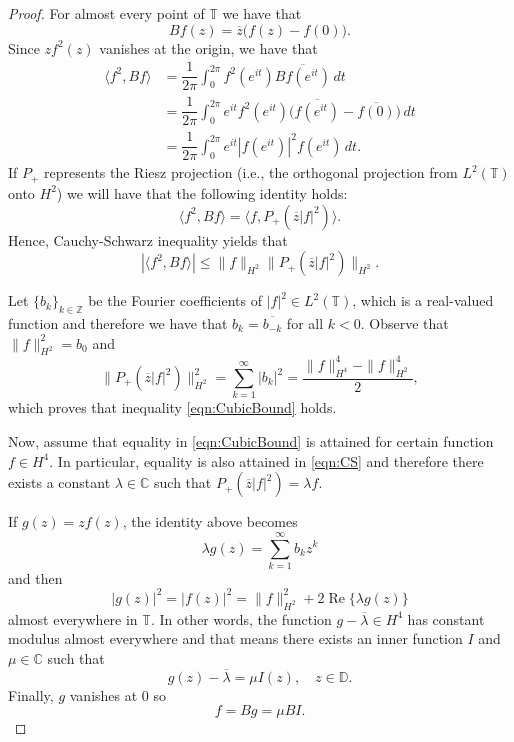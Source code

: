 \documentclass{amsart}
\theoremstyle{plain}
\theoremstyle{definition}
\newcommand{\C}{\mathbb{C}}
\newcommand{\Z}{\mathbb{Z}}
\newcommand{\D}{\mathbb{D}}
\newcommand{\T}{\mathbb{T}}
\renewcommand{\Re}{\operatorname{Re}}
\begin{document}
        \begin{proof}
            
            For almost every point of $\T$ we have that
            \[
            Bf(z) = \overline{z} \big( f(z) - f(0) \big).
            \]
            Since $z f^2(z)$ vanishes at the origin, we have that
            \begin{align*}
                \langle f^2, Bf \rangle & = \dfrac{1}{2\pi} \int_0^{2\pi} f^2 (e^{it}) \overline{Bf(e^{it})} \, dt \\
                & = \dfrac{1}{2\pi} \int_0^{2\pi} e^{it} f^2 (e^{it}) \big( \overline{f(e^{it})} - \overline{f(0)} \big) \, dt \\
                & = \dfrac{1}{2\pi} \int_{0}^{2\pi} e^{it} |f(e^{it})|^2 f(e^{it}) \, dt.
            \end{align*}
            If $P_+$ represents the Riesz projection (i.e., the orthogonal projection from $L^2(\T)$ onto $H^2$) we will have that the following identity holds:
            \[
            \langle f^2, B f \rangle = \langle f, P_+ ( \overline{z} |f|^2 ) \rangle.
            \]
            Hence, Cauchy-Schwarz inequality yields that
            \begin{equation} \label{eqn:CS}
                | \langle f^2, B f \rangle | \leq \| f \|_{H^2} \| P_+ ( \overline{z} |f|^2 ) \|_{H^2}.
            \end{equation}
            
            Let $\{ b_k \}_{k \in \Z}$ be the Fourier coefficients of $|f|^2 \in L^2(\T)$, which is a real-valued function and therefore we have that $b_k = \overline{b_{-k}}$ for all $k < 0$. Observe that $\| f \|_{H^2}^2 = b_0$ and
            \[
            \| P_+ (\overline{z}|f|^2) \|_{H^2}^2 = \sum_{k = 1}^\infty |b_k|^2 = \dfrac{\|f\|_{H^4}^4 - \| f \|_{H^2}^4}{2},
            \]
            which proves that inequality \eqref{eqn:CubicBound} holds.
            
            Now, assume that equality in \eqref{eqn:CubicBound} is attained for certain function $f \in H^4$. In particular, equality is also attained in \eqref{eqn:CS} and therefore there exists a constant $\lambda \in \C$ such that $P_+ (\overline{z}|f|^2) = \lambda f$.
            
            If $g(z) = z f(z)$, the identity above becomes
            \[
            \lambda g(z) = \sum_{k = 1}^\infty b_k z^k
            \]
            and then
            \[
            |g(z)|^2 = |f(z)|^2 = \|f\|_{H^2}^2 + 2 \Re \{ \lambda g(z) \}
            \]
            almost everywhere in $\T$. In other words, the function $g - \overline{\lambda} \in H^4$ has constant modulus almost everywhere and that means there exists an inner function $I$ and $\mu \in \C$ such that
            \[
            g(z) - \overline{\lambda} = \mu I(z), \quad z \in \D.
            \]
            Finally, $g$ vanishes at 0 so
            \[
            f = Bg = \mu B I.
            \]
        \end{proof}
        
\end{document}
